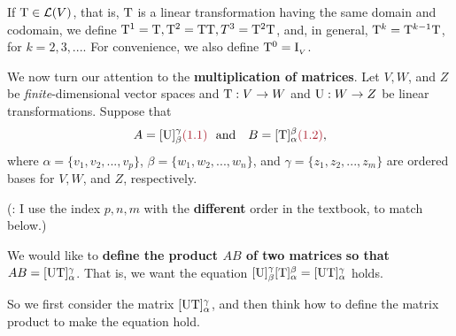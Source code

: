 \begin{additional definition} \label{adef 2.6}
If \(\mathrm{T} \in \mathcal{L}(V)\), that is, \(\mathrm{T}\) is a linear transformation having the same domain and codomain, we define \(\mathrm{T}^1 = \mathrm{T}, \mathrm{T}^2 = \mathrm{T}\mathrm{T}, T^3 = \mathrm{T}^2\mathrm{T}\),
and, in general, \(\mathrm{T}^k = \mathrm{T}^{k - 1}\mathrm{T}\), for \(k = 2,3, ...\).
For convenience, we also define \(\mathrm{T}^0 = \mathrm{I}_{_V}\).
\end{additional definition}

We now turn our attention to the \textbf{multiplication of matrices}.
Let \(V, W\), and \(Z\) be \emph{finite}-dimensional vector spaces and \(\mathrm{T} : V \to W\) and \(\mathrm{U}: W \to Z\) be linear transformations.
Suppose that
\[
    A = [\U]_{\beta}^{\gamma} \MAROON{(1.1)} \text{\ \  and \ \ } B = [\T]_{\alpha}^{\beta} \MAROON{(1.2)},
\]
where \(\alpha = \{v_1, v_2, ... , v_p\}\), \(\beta = \{ w_1, w_2, ..., w_n \}\), and \(\gamma = \{ z_1, z_2, ..., z_m \}\) are ordered bases for \(V, W\), and \(Z\), respectively.

(: I use the index \(p, n, m\) with the \textbf{different} order in the textbook, to match  below.)

We would like to \textbf{define the product \(AB\) of two matrices} \textbf{so that \(AB = [\mathrm{U}\mathrm{T}]_{\alpha}^{\gamma}\)}.
That is, we want the equation \([\mathrm{U}]_{\beta}^{\gamma}[\mathrm{T}]_{\alpha}^{\beta} = [\mathrm{U}\mathrm{T}]_{\alpha}^{\gamma}\) holds.

So we first consider the matrix \([\mathrm{U}\mathrm{T}]_{\alpha}^{\gamma}\), and then think how to define the matrix product to make the equation hold.


